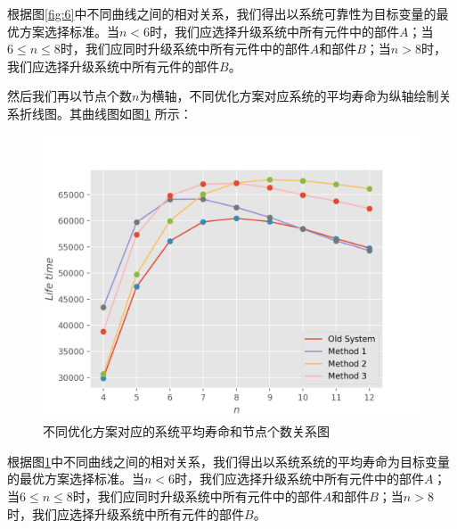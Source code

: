 \documentclass[10.5pt,twocolumn]{jbuaa}
\begin{document}
根据图\ref{fig:6}中不同曲线之间的相对关系，我们得出以系统可靠性为目标变量的最优方案选择标准。当$n < 6$时，我们应选择升级系统中所有元件中的部件$A$；当$ 6 \leq n \leq 8$时，我们应同时升级系统中所有元件中的部件$A$和部件$B$；当$ n > 8$时，我们应选择升级系统中所有元件的部件$B$。

然后我们再以节点个数$n$为横轴，不同优化方案对应系统的平均寿命为纵轴绘制关系折线图。其曲线图如图\ref{fig:7} 所示：

\begin{figure}[H]
	\label{fig:7}
	\includegraphics[scale = 0.6]{fig7.png}
	\caption{不同优化方案对应的系统平均寿命和节点个数关系图}
\end{figure}

根据图\ref{fig:7}中不同曲线之间的相对关系，我们得出以系统系统的平均寿命为目标变量的最优方案选择标准。当$n < 6$时，我们应选择升级系统中所有元件中的部件$A$；当$ 6 \leq n \leq 8$时，我们应同时升级系统中所有元件中的部件$A$和部件$B$；当$ n > 8$时，我们应选择升级系统中所有元件的部件$B$。



\renewcommand\refname{\hei\wuhao\centerline{参考文献（References）}\global\def\refname{参考文献}}
\vskip 12pt

\let\OLDthebibliography\thebibliography
\renewcommand\thebibliography[1]{
  \OLDthebibliography{#1}
  \setlength{\parskip}{0pt}
  \setlength{\itemsep}{0pt plus 0.3ex}
}

{
\renewcommand{\baselinestretch}{0.9}
\liuhao


}
\newpage  %
\end{document}
